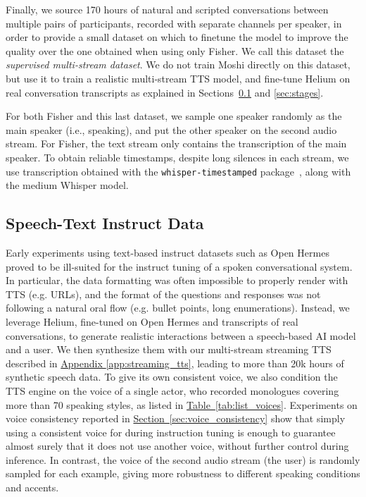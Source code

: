 Finally, we source 170 hours of natural and scripted conversations between multiple pairs of participants, recorded with separate channels per speaker, in order to provide a small dataset on which to finetune the model to improve the quality over the one obtained when using only Fisher. We call this dataset the \emph{supervised multi-stream dataset}. We do not train Moshi directly on this dataset, but use it to train a realistic multi-stream TTS model, and fine-tune Helium on real conversation transcripts as explained in Sections~\ref{sec:instruct_data} and \ref{sec:stages}.

For both Fisher and this last dataset, we sample one speaker randomly as the main speaker (i.e., \ours{} speaking), and put the other speaker on the second audio stream. For Fisher, the text stream only contains 
the transcription of the main speaker. To obtain reliable timestamps, despite long silences in each stream, we 
use transcription obtained with the \texttt{whisper-timestamped} package~\citep{lintoai2023whispertimestamped}, along with the medium Whisper model.

\subsection{Speech-Text Instruct Data}
\label{sec:instruct_data}

Early experiments using text-based instruct datasets such as Open Hermes~\citep{OpenHermes2} proved to be ill-suited for the instruct tuning of a spoken conversational system.
In particular, the data formatting was often impossible to properly render with TTS (e.g. URLs), and the format of the questions and responses was not following a natural oral flow (e.g. bullet points, long enumerations). Instead, we leverage Helium, fine-tuned on Open Hermes and transcripts of real conversations, to generate realistic interactions between a speech-based AI model and a user.
We then synthesize them with our multi-stream streaming TTS described in \hyperref[app:streaming_tts]{Appendix \ref{app:streaming_tts}}, leading to more than 20k hours of synthetic speech data.
To give \ours{} its own consistent voice, we also condition the TTS engine on the voice of a single actor, who recorded monologues covering more than 70 speaking styles, as listed in \hyperref[tab:list_voices]{Table~\ref{tab:list_voices}}. Experiments on voice consistency reported in \hyperref[sec:voice_consistency]{Section~\ref{sec:voice_consistency}} show that simply using a consistent voice for \ours{} during instruction tuning is enough to guarantee almost surely that it does not use another voice, without further control during inference.
In contrast, the voice of the second audio stream (the user) is randomly sampled for each example, giving more robustness to different speaking conditions and accents.


